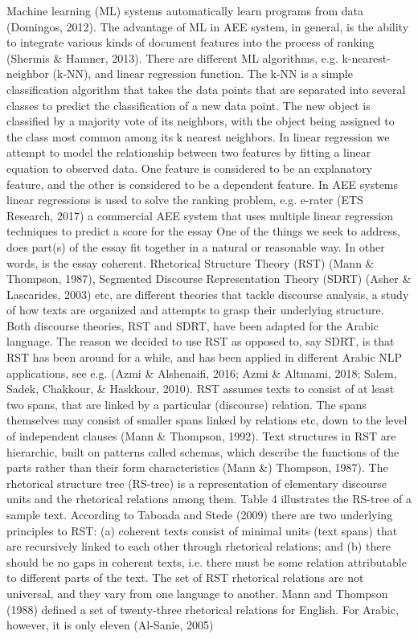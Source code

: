 \documentclass{article}
\begin{document}
Machine learning (ML) systems automatically learn programs from data (Domingos, 2012). The advantage of ML in AEE system,
in general, is the ability to integrate various kinds of document features into the process of ranking (Shermis \& Hamner, 2013). There
are different ML algorithms, e.g. k-nearest-neighbor (k-NN), and linear regression function. The k-NN is a simple classification
algorithm that takes the data points that are separated into several classes to predict the classification of a new data point. The new
object is classified by a majority vote of its neighbors, with the object being assigned to the class most common among its k nearest
neighbors. In linear regression we attempt to model the relationship between two features by fitting a linear equation to observed
data. One feature is considered to be an explanatory feature, and the other is considered to be a dependent feature. In AEE systems
linear regressions is used to solve the ranking problem, e.g. e-rater (ETS Research, 2017) a commercial AEE system that uses multiple
linear regression techniques to predict a score for the essay   
One of the things we seek to address, does part(s) of the essay fit together in a natural or reasonable way. In other words, is the
essay coherent. Rhetorical Structure Theory (RST) (Mann \& Thompson, 1987), Segmented Discourse Representation Theory (SDRT)
(Asher \& Lascarides, 2003) etc, are different theories that tackle discourse analysis, a study of how texts are organized and attempts to
grasp their underlying structure. Both discourse theories, RST and SDRT, have been adapted for the Arabic language. The reason we
decided to use RST as opposed to, say SDRT, is that RST has been around for a while, and has been applied in different Arabic NLP
applications, see e.g. (Azmi \& Alshenaifi, 2016; Azmi \& Altmami, 2018; Salem, Sadek, Chakkour, \& Haskkour, 2010). RST assumes
texts to consist of at least two spans, that are linked by a particular (discourse) relation. The spans themselves may consist of smaller
spans linked by relations etc, down to the level of independent clauses (Mann \& Thompson, 1992). Text structures in RST are
hierarchic, built on patterns called schemas, which describe the functions of the parts rather than their form characteristics (Mann \&)
Thompson, 1987). The rhetorical structure tree (RS-tree) is a representation of elementary discourse units and the rhetorical relations
among them. Table 4 illustrates the RS-tree of a sample text. According to Taboada and Stede (2009) there are two underlying
principles to RST: (a) coherent texts consist of minimal units (text spans) that are recursively linked to each other through rhetorical
relations; and (b) there should be no gaps in coherent texts, i.e. there must be some relation attributable to different parts of the text.
The set of RST rhetorical relations are not universal, and they vary from one language to another. Mann and Thompson (1988)
defined a set of twenty-three rhetorical relations for English. For Arabic, however, it is only eleven (Al-Sanie, 2005)
\end{document}
